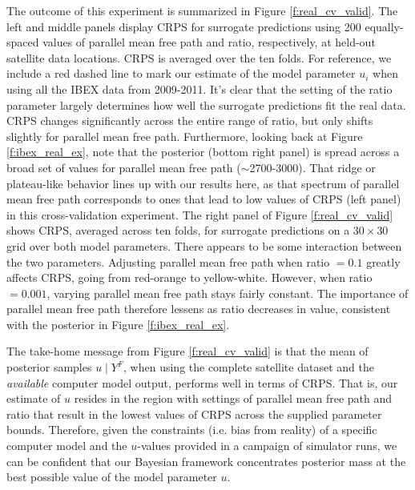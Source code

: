 \documentclass[11pt]{article}
\begin{document}
The outcome of this experiment is summarized in Figure \ref{f:real_cv_valid}.
The left and middle panels display CRPS for surrogate predictions using 200
equally-spaced values of parallel mean free path and ratio, respectively, at
held-out satellite data locations. CRPS is averaged over the ten folds. For
reference, we include a red dashed line to mark our estimate of the model
parameter $u_i$ when using all the IBEX data from 2009-2011. It's clear that
the setting of the ratio parameter largely determines how well the surrogate
predictions fit the real data. CRPS changes significantly across the entire
range of ratio, but only shifts slightly for parallel mean free path.
Furthermore, looking back at Figure \ref{f:ibex_real_ex}, note that the
posterior (bottom right panel) is spread across a broad set of values for
parallel mean free path ($\sim$2700-3000). That ridge or plateau-like behavior
lines up with our results here, as that spectrum of parallel mean free path
corresponds to ones that lead to low values of CRPS (left panel) in this
cross-validation experiment. The right panel of Figure \ref{f:real_cv_valid}
shows CRPS, averaged across ten folds, for surrogate predictions on a
$30\times30$ grid over both model parameters. There appears to be some
interaction between the two parameters. Adjusting parallel mean free path when
ratio $= 0.1$ greatly affects CRPS, going from red-orange to yellow-white.
However, when ratio $= 0.001$, varying parallel mean free path stays fairly
constant. The importance of parallel mean free path therefore lessens as ratio
decreases in value, consistent with the posterior in Figure
\ref{f:ibex_real_ex}.

The take-home message from Figure \ref{f:real_cv_valid} is that the mean of
posterior samples $u \mid Y^F$, when using the complete satellite dataset and
the \textit{available} computer model output, performs well in terms of CRPS.
That is, our estimate of $u$ resides in the region with settings of parallel
mean free path and ratio that result in the lowest values of CRPS across the
supplied parameter bounds. Therefore, given the constraints (i.e. bias from
reality) of a specific computer model and the $u$-values provided in a campaign
of simulator runs, we can be confident that our Bayesian framework concentrates
posterior mass at the best possible value of the model parameter $u$.


\end{document}
